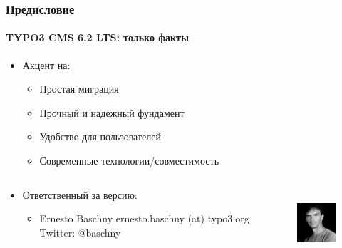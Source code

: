 \begin{frame}[fragile]
	\frametitle{Предисловие}
	\framesubtitle{TYPO3 CMS 6.2 LTS: только факты}

	\begin{itemize}
		\item Акцент на:

			\begin{itemize}
				\item Простая миграция
				\item Прочный и надежный фундамент
				\item Удобство для пользователей
				\item Современные технологии/совместимость
			\end{itemize}

	\end{itemize}

	\begin{columns}[T]

		\begin{column}{.5\textwidth}
			\begin{itemize}
				\item Ответственный за версию:
				\begin{itemize}
					\item Ernesto Baschny\newline
						ernesto.baschny (at) typo3.org\newline
						Twitter: @baschny
				\end{itemize}
			\end{itemize}
		\end{column}

		\begin{column}{.5\textwidth}
			\begin{figure}
				\includegraphics[width=2.6cm,height=2.6cm]{Images/Introduction/ErnestoBaschny.jpg}
			\end{figure}
		\end{column}

	\end{columns}

\end{frame}

